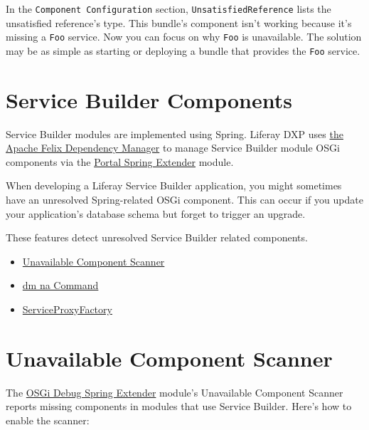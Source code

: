 In the \texttt{Component\ Configuration} section,
\texttt{UnsatisfiedReference} lists the unsatisfied reference's type.
This bundle's component isn't working because it's missing a
\texttt{Foo} service. Now you can focus on why \texttt{Foo} is
unavailable. The solution may be as simple as starting or deploying a
bundle that provides the \texttt{Foo} service.

\section{Service Builder Components}\label{service-builder-components}

Service Builder modules are implemented using Spring. Liferay DXP uses
\href{http://felix.apache.org/documentation/subprojects/apache-felix-dependency-manager.html}{the
Apache Felix Dependency Manager} to manage Service Builder module OSGi
components via the
\href{https://repository.liferay.com/nexus/content/repositories/liferay-public-releases/com/liferay/com.liferay.portal.spring.extender/}{Portal
Spring Extender} module.

When developing a Liferay Service Builder application, you might
sometimes have an unresolved Spring-related OSGi component. This can
occur if you update your application's database schema but forget to
trigger an upgrade.

These features detect unresolved Service Builder related components.

\begin{itemize}
\tightlist
\item
  \hyperref[unavailable-component-scanner]{Unavailable Component
  Scanner}
\item
  \hyperref[dm-na-command]{dm na Command}
\item
  \hyperref[serviceproxyfactory]{ServiceProxyFactory}
\end{itemize}

\section{Unavailable Component
Scanner}\label{unavailable-component-scanner}

The
\href{https://repository.liferay.com/nexus/content/repositories/liferay-public-releases/com/liferay/com.liferay.portal.osgi.debug.spring.extender/}{OSGi
Debug Spring Extender} module's Unavailable Component Scanner reports
missing components in modules that use Service Builder. Here's how to
enable the scanner:


